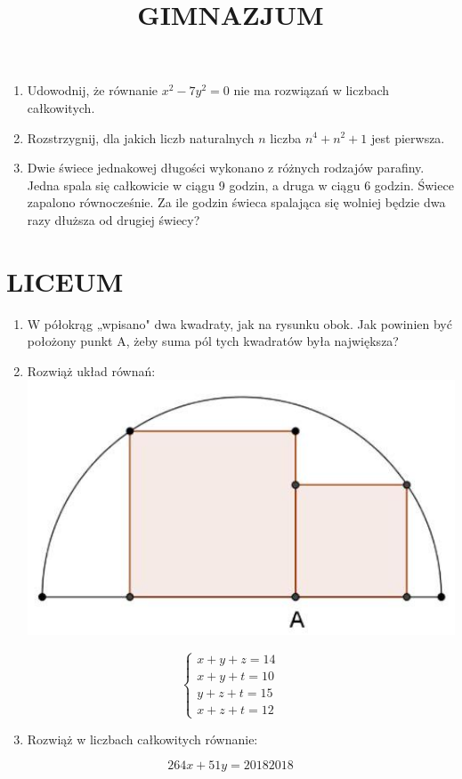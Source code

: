 \documentclass[10pt]{article}
\title{GIMNAZJUM }
\author{}
\date{}
\begin{document}
\maketitle
\begin{enumerate}
  \item Udowodnij, że równanie \(x^{2}-7 y^{2}=0\) nie ma rozwiązań w liczbach całkowitych.
  \item Rozstrzygnij, dla jakich liczb naturalnych \(n\) liczba \(n^{4}+n^{2}+1\) jest pierwsza.
  \item Dwie świece jednakowej długości wykonano z różnych rodzajów parafiny. Jedna spala się całkowicie w ciągu 9 godzin, a druga w ciągu 6 godzin. Świece zapalono równocześnie. Za ile godzin świeca spalająca się wolniej będzie dwa razy dłuższa od drugiej świecy?
\end{enumerate}

\section*{LICEUM}
\begin{enumerate}
  \item W półokrąg „wpisano" dwa kwadraty, jak na rysunku obok. Jak powinien być położony punkt A, żeby suma pól tych kwadratów była największa?
  \item Rozwiąż układ równań:\\
\includegraphics[max width=\textwidth, center]{2024_11_21_1c440a0883d44ee4ee80g-1}
\end{enumerate}

\[
\left\{\begin{array}{l}
x+y+z=14 \\
x+y+t=10 \\
y+z+t=15 \\
x+z+t=12
\end{array}\right.
\]

\begin{enumerate}
  \setcounter{enumi}{2}
  \item Rozwiąż w liczbach całkowitych równanie:
\end{enumerate}

\[
264 x+51 y=20182018
\]
\end{document}
